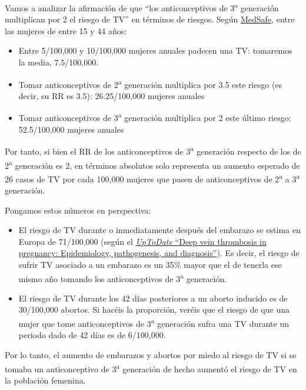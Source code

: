 \documentclass[
]{book}
\theoremstyle{definition}
\theoremstyle{definition}
\theoremstyle{definition}
\theoremstyle{definition}
\theoremstyle{remark}
\begin{document}
Vamos a analizar la afirmación de que ``los anticonceptivos de 3\textsuperscript{a} generación multiplican por 2 el riesgo de TV'' en términos de riesgos. Según \href{https://www.medsafe.govt.nz/consumers/leaflets/oralcontraceptives.asp}{MedSafe}, entre las mujeres de entre 15 y 44 años:

\begin{itemize}
\item
  Entre 5/100,000 y 10/100,000 mujeres anuales padecen una TV: tomaremos la media, 7.5/100,000.
\item
  Tomar anticonceptivos de 2\textsuperscript{a} generación multiplica por 3.5 este riesgo (es decir, su RR es 3.5): 26.25/100,000 mujeres anuales
\item
  Tomar anticonceptivos de 3\textsuperscript{a} generación multiplica por 2 este último riesgo: 52.5/100,000 mujeres anuales
\end{itemize}

Por tanto, si bien el RR de los anticonceptivos de 3\textsuperscript{a} generación respecto de los de 2\textsuperscript{a} generación es 2, en términos absolutos solo representa un aumento esperado de 26 casos de TV por cada 100,000 mujeres que pasen de anticonceptivos de 2\textsuperscript{a} a 3\textsuperscript{a} generación.

Pongamos estos números en perspectiva:

\begin{itemize}
\item
  El riesgo de TV durante o inmediatamente después del embarazo se estima en Europa de 71/100,000 (según el \href{/url\%7Bhttp://www.uptodate.com/contents/deep-vein-thrombosis-in-pregnancy-epidemiology-pathogenesis-and-diagnosis}{\emph{UpToDate} ``Deep vein thrombosis in pregnancy: Epidemiology, pathogenesis, and diagnosis''}). Es decir, el riesgo de sufrir TV asociado a un embarazo es un 35\% mayor que el de tenerla ese mismo año tomando los anticonceptivos de 3\textsuperscript{a} generación.
\item
  El riesgo de TV durante los 42 días posteriores a un aborto inducido es de 30/100,000 abortos. Si hacéis la proporción, veréis que el riesgo de que una mujer que tome anticonceptivos de 3\textsuperscript{a} generación sufra una TV durante un periodo dado de 42 días es de 6/100,000.
\end{itemize}

Por lo tanto, el aumento de embarazos y abortos por miedo al riesgo de TV si se tomaba un anticonceptivo de 3\textsuperscript{a} generación de hecho aumentó el riesgo de TV en la población femenina.
\end{document}
